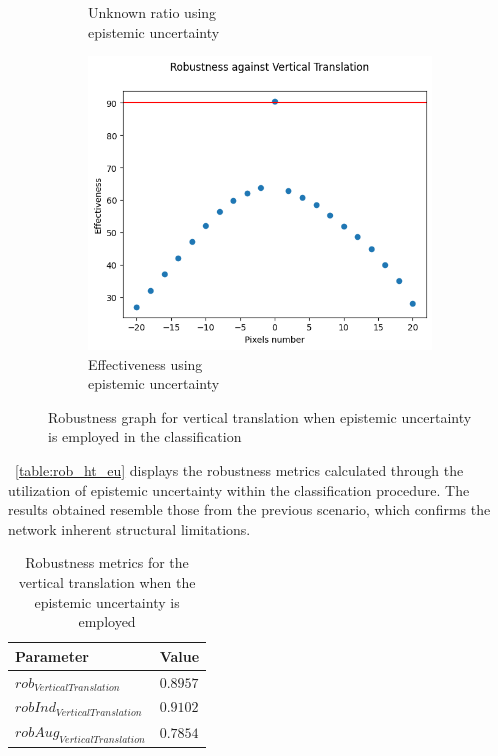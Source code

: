 \begin{figure}[h]
\begin{subfigure}{.33\textwidth}
		\caption{Unknown ratio using \\ epistemic uncertainty}
		\label{fig:vt_eu_unkn}
	\end{subfigure}%
	\begin{subfigure}{.33\textwidth}
		\centering
		\includegraphics[width=0.9\linewidth]{ImageFiles/EvalBNN/VT/EU/eff}
		\caption{Effectiveness using \\ epistemic uncertainty}
		\label{fig:vt_eu_eff}
	\end{subfigure}
	\caption{Robustness graph for vertical translation when epistemic uncertainty is employed in the classification}
	\label{fig:vt_eu}
\end{figure}

\Tab~\ref{table:rob_ht_eu} displays the robustness metrics calculated through the utilization of epistemic uncertainty within the classification procedure. The results obtained resemble those from the previous scenario, which confirms the network inherent structural limitations.

\begin{table}[h]
	\centering
	\begin{tabular}{|| l | l ||} 
		\hline
		\textbf{Parameter} & \textbf{Value} \\
		\hline
		\hline
		$rob_{VerticalTranslation}$ & $0.8957$ \\
		$robInd_{VerticalTranslation}$ & $0.9102$ \\
		$robAug_{VerticalTranslation}$ & $0.7854$ \\	
		\hline
	\end{tabular}	
	\caption{Robustness metrics for the vertical translation when the epistemic uncertainty is employed}
	\label{table:rob_vt_eu}
\end{table}

